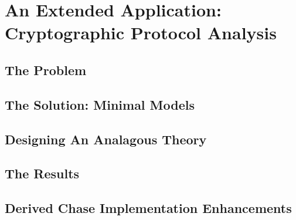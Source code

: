 \section{An Extended Application: \\ Cryptographic Protocol Analysis}

	\subsection{The Problem}

	\subsection{The Solution: Minimal Models}

	\subsection{Designing An Analagous Theory}

	\subsection{The Results}

	\subsection{Derived Chase Implementation Enhancements}
